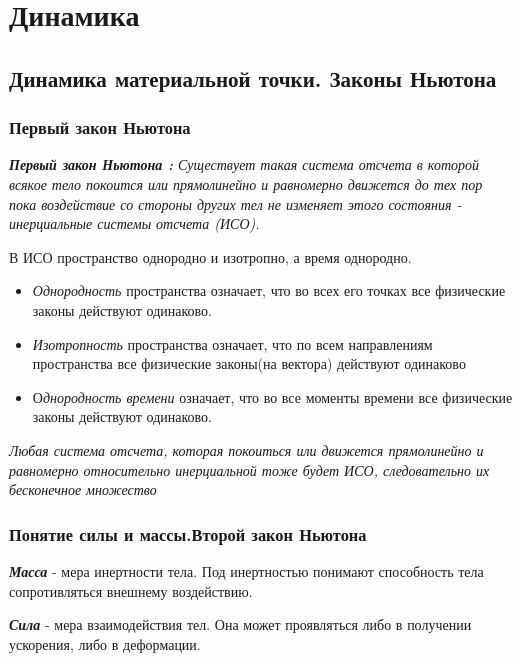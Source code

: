 \chapter{Динамика}

\section{Динамика материальной точки. Законы Ньютона}
\subsection{Первый закон Ньютона}
\textit{\textbf{Первый закон Ньютона :} Существует такая система отсчета в которой всякое тело покоится или прямолинейно и равномерно движется до тех пор пока воздействие со стороны других тел не изменяет этого состояния - инерциальные системы отсчета (ИСО).}

\vspace{5px}

В ИСО пространство однородно и изотропно, а время однородно.
\begin{itemize}
    \item \textit{Однородность} пространства означает, что во всех его точках все физические законы действуют одинаково.
    \item \textit{Изотропность} пространства означает, что по всем направлениям пространства все физические законы(на вектора) действуют одинаково
    \item О\textit{днородность времени} означает, что во все моменты времени все физические законы действуют одинаково.
\end{itemize}
\textit{Любая система отсчета, которая покоиться или движется прямолинейно и равномерно относительно инерциальной тоже будет ИСО, следовательно их бесконечное множество}
\subsection{Понятие силы и массы.Второй закон Ньютона}

  \textbf{\textit{Масса}} - мера инертности тела. Под инертностью понимают способность тела сопротивляться внешнему воздействию.

\vspace{5px}

  \textbf{\textit{Сила}} - мера взаимодействия тел. Она может проявляться либо в получении ускорения, либо в деформации.

